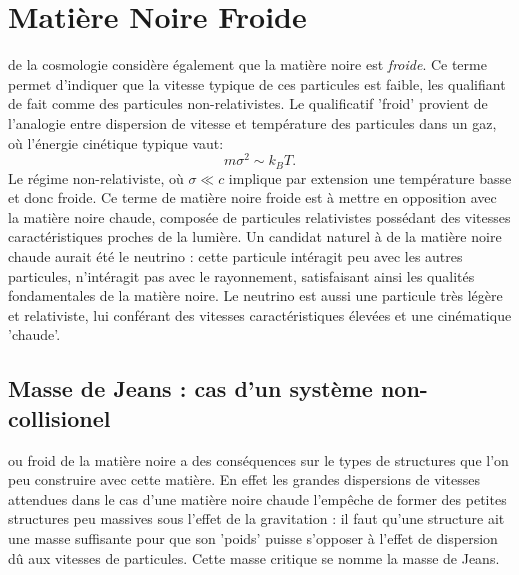 \section{Matière Noire Froide}

 de la cosmologie considère également que la matière noire est \textit{froide}. Ce terme permet d'indiquer que la vitesse typique de ces particules est faible, les qualifiant de fait comme des particules non-relativistes. Le qualificatif 'froid' provient de l'analogie entre dispersion de vitesse et température des particules dans un gaz, où l'énergie cinétique typique vaut:
\begin{equation}
m\sigma^2 \sim k_B T.
\end{equation}
Le régime non-relativiste, où $\sigma \ll c$ implique par extension une température basse et donc froide. Ce terme de matière noire froide est à mettre en opposition avec la matière noire chaude, composée de particules relativistes possédant des vitesses caractéristiques proches de la lumière. Un candidat naturel à de la matière noire chaude aurait été le neutrino : cette particule intéragit peu avec les autres particules, n'intéragit pas avec le rayonnement, satisfaisant ainsi les qualités fondamentales de la matière noire. Le neutrino est aussi une particule très légère et relativiste, lui conférant des vitesses caractéristiques élevées et une cinématique 'chaude'.

\subsection{Masse de Jeans : cas d'un système non-collisionel}
 ou froid de la matière noire a des conséquences sur le types de structures que l'on peu construire avec cette matière. En effet les grandes dispersions de vitesses attendues dans le cas d'une matière noire chaude l'empêche de former des petites structures peu massives sous l'effet de la gravitation : il faut qu'une structure ait une masse suffisante pour que son 'poids' puisse s'opposer à l'effet de dispersion dû aux vitesses de particules. Cette masse critique se nomme la masse de Jeans.

